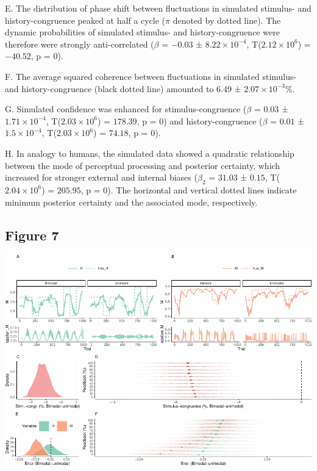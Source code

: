 \documentclass[
]{article}
\begin{document}
E. The distribution of phase shift between fluctuations in simulated
stimulus- and history-congruence peaked at half a cycle (\(\pi\) denoted
by dotted line). The dynamic probabilities of simulated stimulus- and
history-congruence were therefore were strongly anti-correlated
(\(\beta\) = \(-0.03\) ± \(\ensuremath{8.22\times 10^{-4}}\),
T(\(\ensuremath{2.12\times 10^{6}}\)) = \(-40.52\), p = \(0\)).

F. The average squared coherence between fluctuations in simulated
stimulus- and history-congruence (black dotted line) amounted to 6.49 ±
\ensuremath{2.07\times 10^{-3}}\%.

G. Simulated confidence was enhanced for stimulus-congruence (\(\beta\)
= \(0.03\) ± \(\ensuremath{1.71\times 10^{-4}}\),
T(\(\ensuremath{2.03\times 10^{6}}\)) = \(178.39\), p = \(0\)) and
history-congruence (\(\beta\) = \(0.01\) ±
\(\ensuremath{1.5\times 10^{-4}}\),
T(\(\ensuremath{2.03\times 10^{6}}\)) = \(74.18\), p = \(0\)).

H. In analogy to humans, the simulated data showed a quadratic
relationship between the mode of perceptual processing and posterior
certainty, which increased for stronger external and internal biases
(\(\beta_2\) = \(31.03\) ± \(0.15\),
T(\(\ensuremath{2.04\times 10^{6}}\)) = \(205.95\), p = \(0\)). The
horizontal and vertical dotted lines indicate minimum posterior
certainty and the associated mode, respectively.

\newpage

\hypertarget{figure-7}{%
\subsection{Figure 7}\label{figure-7}}

\includegraphics{modes_mouse_files/figure-latex/Figure_7-1.pdf}
\end{document}
